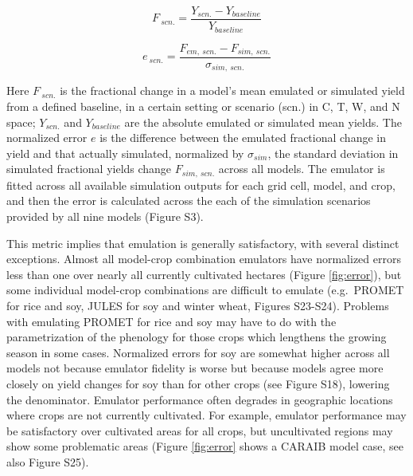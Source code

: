 \documentclass[gmd, manuscript]{copernicus} %
\begin{document}
\begin{equation}
    \label{eqn:per_yield}
    F_{\: scn.}=\frac{Y_{scn.}-Y_{baseline}}{Y_{baseline}}
\end{equation}

\begin{equation}
    \label{eqn:error}
    e_{\: scn.} =\frac{F_{em, \: scn.}-F_{sim, \: scn.}}{\sigma_{sim, \: scn.}}
\end{equation}

Here $F_{\: scn.}$ is the fractional change in a model's mean emulated or simulated yield from a defined baseline, in a certain setting or scenario (scn.) in C, T, W, and N space; $Y_{scn.}$ and $Y_{baseline}$ are the absolute emulated or simulated mean yields. The normalized error $e$ is the difference between the emulated fractional change in yield and that actually simulated, normalized by $\sigma_{sim}$, the standard deviation in simulated fractional yields change $F_{sim,\: scn.}$ across all models. The emulator is fitted across all available simulation outputs for each grid cell, model, and crop, and then the error is calculated across the each of the simulation scenarios provided by all nine models (Figure S3). 

This metric implies that emulation is generally satisfactory, with several distinct exceptions. Almost all model-crop combination emulators have normalized errors less than one over nearly all currently cultivated hectares (Figure \ref{fig:error}), but some individual model-crop combinations are difficult to emulate (e.g.\ PROMET for rice and soy, JULES for soy and winter wheat, Figures S23-S24). Problems with emulating PROMET for rice and soy may have to do with the parametrization of the phenology for those crops which lengthens the growing season in some cases. Normalized errors for soy are somewhat higher across all models not because emulator fidelity is worse but because models agree more closely on yield changes for soy than for other crops (see Figure S18), lowering the denominator. Emulator performance often degrades in geographic locations where crops are not currently cultivated. For example, emulator performance may be satisfactory over cultivated areas for all crops, but uncultivated regions may show some problematic areas (Figure \ref{fig:error} shows a CARAIB model case, see also Figure S25).
\end{document}
